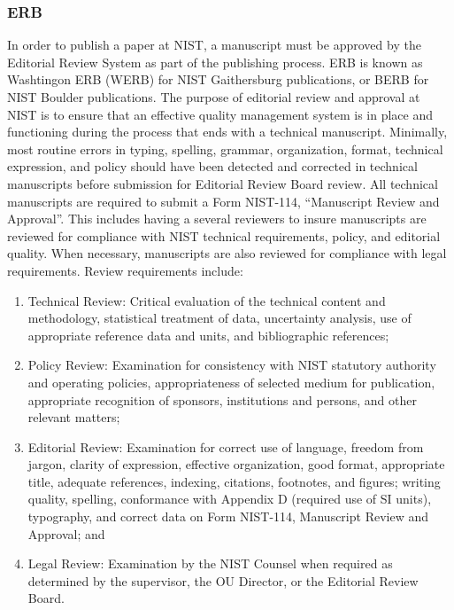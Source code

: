 \subsubsection{ERB}
In order to publish a paper at NIST, a manuscript must be approved by the  Editorial Review System as part of the publishing process. ERB is known as Washtingon ERB (WERB) for NIST Gaithersburg publications, or BERB for NIST Boulder publications. The purpose of editorial review and approval at NIST is to ensure that an effective quality management system is in place and functioning during the process that ends with a technical manuscript. Minimally, most routine errors in typing, spelling, grammar, organization, format, technical expression, and policy should have been detected and corrected in technical manuscripts before submission for Editorial Review Board review. All technical manuscripts are required to submit a Form NIST-114, ``Manuscript Review and Approval''. This includes having a several reviewers to  insure manuscripts are reviewed for compliance with NIST technical requirements, policy, and editorial quality. When necessary, manuscripts are also reviewed for compliance with legal requirements. Review requirements include:

\begin{enumerate}
    \item 
 Technical Review: Critical evaluation of the technical content and methodology, statistical treatment of data, uncertainty analysis, use of appropriate reference data and units, and bibliographic references;
    \item 
Policy Review: Examination for consistency with NIST statutory authority and operating policies, appropriateness of selected medium for publication, appropriate recognition of sponsors, institutions and persons, and other relevant matters;
    \item 
Editorial Review: Examination for correct use of language, freedom from jargon, clarity of expression, effective organization, good format, appropriate title, adequate references, indexing, citations, footnotes, and figures; writing quality, spelling, conformance with Appendix D (required use of SI units), typography, and correct data on Form NIST-114, Manuscript Review and Approval; and
    \item 
 Legal Review: Examination by the NIST Counsel when required as determined by the supervisor, the OU Director, or the Editorial Review Board.
\end{enumerate}



